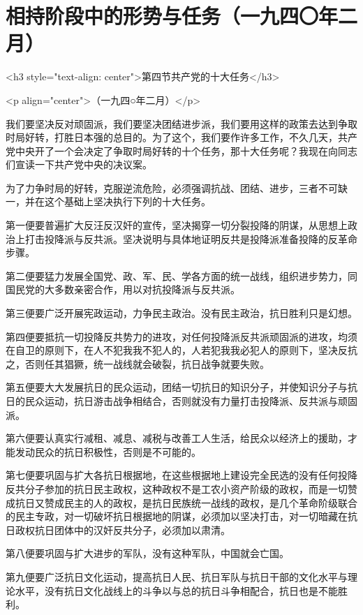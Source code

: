 \section[相持阶段中的形势与任务（一九四〇年二月）]{相持阶段中的形势与任务（一九四〇年二月）}


<h3 style="text-align: center">第四节共产党的十大任务</h3>

<p align="center">（一九四○年二月）</p>


我们要坚决反对顽固派，我们要坚决团结进步派，我们要用这样的政策去达到争取时局好转，打胜日本强的总目的。为了这个，我们要作许多工作，不久几天，共产党中央开了一个会决定了争取时局好转的十个任务，那十大任务呢？我现在向同志们宣读一下共产党中央的决议案。

为了力争时局的好转，克服逆流危险，必须强调抗战、团结、进步，三者不可缺一，并在这个基础上坚决执行下列的十大任务。

第一便要普遍扩大反汪反汉奸的宣传，坚决揭穿一切分裂投降的阴谋，从思想上政治上打击投降派与反共派。坚决说明与具体地证明反共是投降派准备投降的反革命步骤。

第二便要猛力发展全国党、政、军、民、学各方面的统一战线，组织进步势力，同国民党的大多数亲密合作，用以对抗投降派与反共派。

第三便要广泛开展宪政运动，力争民主政治。没有民主政治，抗日胜利只是幻想。

第四便要抵抗一切投降反共势力的进攻，对任何投降派反共派顽固派的进攻，均须在自卫的原则下，在人不犯我我不犯人的，人若犯我我必犯人的原则下，坚决反抗之，否则任其猖獗，统一战线就会破裂，抗日战争就要失败。

第五便要大大发展抗日的民众运动，团结一切抗日的知识分子，并使知识分子与抗日的民众运动，抗日游击战争相结合，否则就没有力量打击投降派、反共派与顽固派。

第六便要认真实行减租、减息、减税与改善工人生活，给民众以经济上的援助，才能发动民众的抗日积极性，否则是不可能的。

第七便要巩固与扩大各抗日根据地，在这些根据地上建设完全民选的没有任何投降反共分子参加的抗日民主政权，这种政权不是工农小资产阶级的政权，而是一切赞成抗日又赞成民主的人的政权，是抗日民族统一战线的政权，是几个革命阶级联合的民主专政，对一切破坏抗日根据地的阴谋，必须加以坚决打击，对一切暗藏在抗日政权抗日团体中的汉奸反共分子，必须加以肃清。

第八便要巩固与扩大进步的军队，没有这种军队，中国就会亡国。

第九便要广泛抗日文化运动，提高抗日人民、抗日军队与抗日干部的文化水平与理论水平，没有抗日文化战线上的斗争以与总的抗日斗争相配合，抗日也是不能胜利。

